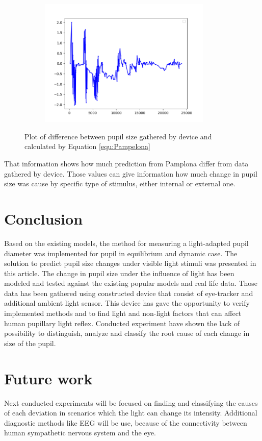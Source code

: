 \documentclass[USenglish,twocolumn]{article}
\begin{document}
\begin{figure}[H]
	\begin{subfigure}[b]{0.45\textwidth}
		\centering
		\includegraphics[width=0.9\textwidth]{img/Resoults/StairCase.png}
		\caption{}
		\label{fig:Resoults3}
	\end{subfigure}
	\caption{Plot of difference between pupil size gathered by device and calculated by Equation \ref{equ:Pampelona} }	
	\label{fig:resoults}
\end{figure}
That information shows how much prediction from Pamplona differ from data gathered by device. 
 Those values can give information how much change in pupil size was cause by specific type of stimulus, either  internal or external one. 
\section{Conclusion}
Based on the existing models, the method for measuring a light-adapted pupil diameter was implemented for pupil in equilibrium and dynamic case. The solution to predict pupil size changes under visible light stimuli was presented in this article. The change in pupil size under the influence of light has been modeled and tested against the existing popular models and real life data. Those data has been gathered using constructed device that consist of eye-tracker and additional ambient light sensor. This device has gave the opportunity to verify implemented methods and to find light and non-light factors that can affect human pupillary light reflex. Conducted experiment have shown the lack of possibility to distinguish, analyze and classify the root cause of each change in size of the pupil.
\section{Future work}
Next conducted experiments will be focused on finding and classifying the causes of each deviation in scenarios which the light can change its intensity. Additional diagnostic methods like EEG will be use, because of the connectivity between human sympathetic nervous system and the eye.
\end{document}
